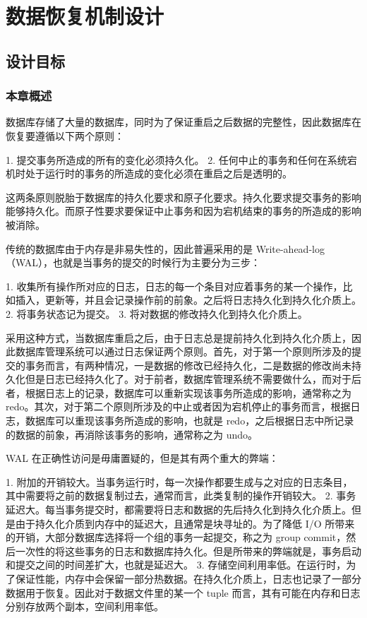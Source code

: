 
\chapter{数据恢复机制设计}
\label{chap:recovery}


\section{设计目标}

\subsection{本章概述}

数据库存储了大量的数据库，同时为了保证重启之后数据的完整性，因此数据库在恢复要遵循以下两个原则：

1. 提交事务所造成的所有的变化必须持久化。
2. 任何中止的事务和任何在系统宕机时处于运行时的事务的所造成的变化必须在重启之后是透明的。

这两条原则脱胎于数据库的持久化要求和原子化要求。持久化要求提交事务的影响能够持久化。而原子性要求要保证中止事务和因为宕机结束的事务的所造成的影响被消除。

传统的数据库由于内存是非易失性的，因此普遍采用的是 Write-ahead-log（WAL），也就是当事务的提交的时候行为主要分为三步：

1. 收集所有操作所对应的日志，日志的每一个条目对应着事务的某一个操作，比如插入，更新等，并且会记录操作前的前象。之后将日志持久化到持久化介质上。
2. 将事务状态记为提交。
3. 将对数据的修改持久化到持久化介质上。

采用这种方式，当数据库重启之后，由于日志总是提前持久化到持久化介质上，因此数据库管理系统可以通过日志保证两个原则。首先，对于第一个原则所涉及的提交的事务而言，有两种情况，一是数据的修改已经持久化，二是数据的修改尚未持久化但是日志已经持久化了。对于前者，数据库管理系统不需要做什么，而对于后者，根据日志上的记录，数据库可以重新实现该事务所造成的影响，通常称之为 redo。其次，对于第二个原则所涉及的中止或者因为宕机停止的事务而言，根据日志，数据库可以重现该事务所造成的影响，也就是 redo，之后根据日志中所记录的数据的前象，再消除该事务的影响，通常称之为 undo。

WAL 在正确性访问是毋庸置疑的，但是其有两个重大的弊端：

1. 附加的开销较大。当事务运行时，每一次操作都要生成与之对应的日志条目，其中需要将之前的数据复制过去，通常而言，此类复制的操作开销较大。
2. 事务延迟大。每当事务提交时，都需要将日志和数据的先后持久化到持久化介质上。但是由于持久化介质到内存中的延迟大，且通常是块寻址的。为了降低 I/O 所带来的开销，大部分数据库选择将一个组的事务一起提交，称之为 group commit，然后一次性的将这些事务的日志和数据库持久化。但是所带来的弊端就是，事务启动和提交之间的时间差扩大，也就是延迟大。
3. 存储空间利用率低。在运行时，为了保证性能，内存中会保留一部分热数据。在持久化介质上，日志也记录了一部分数据用于恢复。因此对于数据文件里的某一个 tuple 而言，其有可能在内存和日志分别存放两个副本，空间利用率低。

